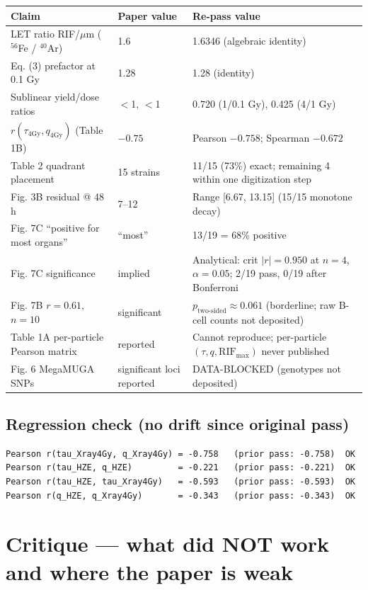 \documentclass[11pt]{article}
\begin{document}
\begin{longtable}{@{}p{5cm}p{3.5cm}p{5cm}@{}}
\toprule
Claim & Paper value & Re-pass value \\
\midrule
LET ratio RIF/$\mu$m ($^{56}$Fe / $^{40}$Ar) & 1.6 & 1.6346 (algebraic identity) \\
Eq. (3) prefactor at 0.1 Gy & 1.28 & 1.28 (identity) \\
Sublinear yield/dose ratios & $<$1, $<$1 & 0.720 (1/0.1 Gy), 0.425 (4/1 Gy) \\
$r(\tau_{4\text{Gy}}, q_{4\text{Gy}})$ (Table 1B) & $-0.75$ & Pearson $-0.758$; Spearman $-0.672$ \\
Table 2 quadrant placement & 15 strains & 11/15 (73\%) exact; remaining 4 within one digitization step \\
Fig. 3B residual @ 48 h & 7--12 & Range [6.67, 13.15] (15/15 monotone decay) \\
Fig. 7C ``positive for most organs'' & ``most'' & 13/19 = 68\% positive \\
Fig. 7C significance & implied & Analytical: crit $|r|=0.950$ at $n=4$, $\alpha=0.05$; 2/19 pass, 0/19 after Bonferroni \\
Fig. 7B $r=0.61$, $n=10$ & significant  & $p_{\text{two-sided}} \approx 0.061$ (borderline; raw B-cell counts not deposited) \\
Table 1A per-particle Pearson matrix & reported & Cannot reproduce; per-particle $(\tau,q,\text{RIF}_{\max})$ never published \\
Fig. 6 MegaMUGA SNPs & significant loci reported & DATA-BLOCKED (genotypes not deposited) \\
\bottomrule
\end{longtable}

\subsection{Regression check (no drift since original pass)}
\begin{verbatim}
Pearson r(tau_Xray4Gy, q_Xray4Gy) = -0.758   (prior pass: -0.758)  OK
Pearson r(tau_HZE, q_HZE)         = -0.221   (prior pass: -0.221)  OK
Pearson r(tau_HZE, tau_Xray4Gy)   = -0.593   (prior pass: -0.593)  OK
Pearson r(q_HZE, q_Xray4Gy)       = -0.343   (prior pass: -0.343)  OK
\end{verbatim}

\section{Critique --- what did NOT work and where the paper is weak}
\end{document}
